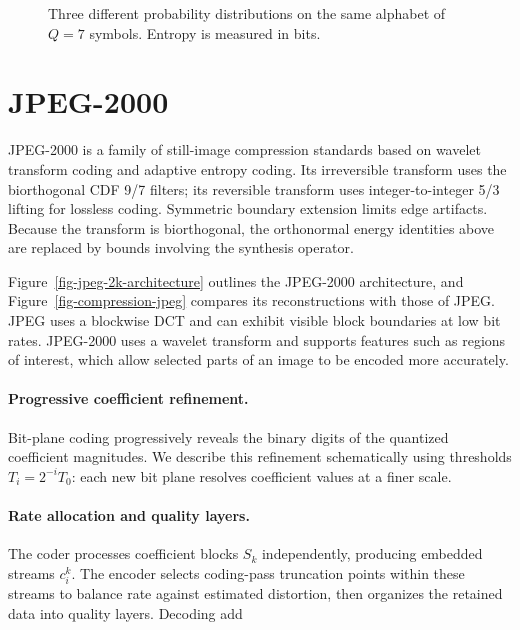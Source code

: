 \begin{figure}[tbp]
\centering
{}\hfill
{}\hfill
{}
\caption{Three different probability distributions on the same alphabet of $Q=7$ symbols. Entropy is measured in bits.}
\label{fig-entropy}
\end{figure}



                                        
\section{JPEG-2000}

JPEG-2000 is a family of still-image compression standards based on wavelet transform coding and adaptive entropy coding. Its irreversible transform uses the biorthogonal CDF 9/7 filters; its reversible transform uses integer-to-integer 5/3 lifting for lossless coding. Symmetric boundary extension limits edge artifacts. Because the transform is biorthogonal, the orthonormal energy identities above are replaced by bounds involving the synthesis operator.


Figure~\ref{fig-jpeg-2k-architecture} outlines the JPEG-2000 architecture, and Figure~\ref{fig-compression-jpeg} compares its reconstructions with those of JPEG. JPEG uses a blockwise DCT and can exhibit visible block boundaries at low bit rates. JPEG-2000 uses a wavelet transform and supports features such as regions of interest, which allow selected parts of an image to be encoded more accurately.
 


  
\paragraph{Progressive coefficient refinement.}

Bit-plane coding progressively reveals the binary digits of the quantized coefficient magnitudes. We describe this refinement schematically using thresholds $T_i = 2^{-i}T_0$: each new bit plane resolves coefficient values at a finer scale.

  
\paragraph{Rate allocation and quality layers.}
The coder processes coefficient blocks $S_k$ independently, producing embedded streams $c_i^k$. The encoder selects coding-pass truncation points within these streams to balance rate against estimated distortion, then organizes the retained data into quality layers. Decoding add